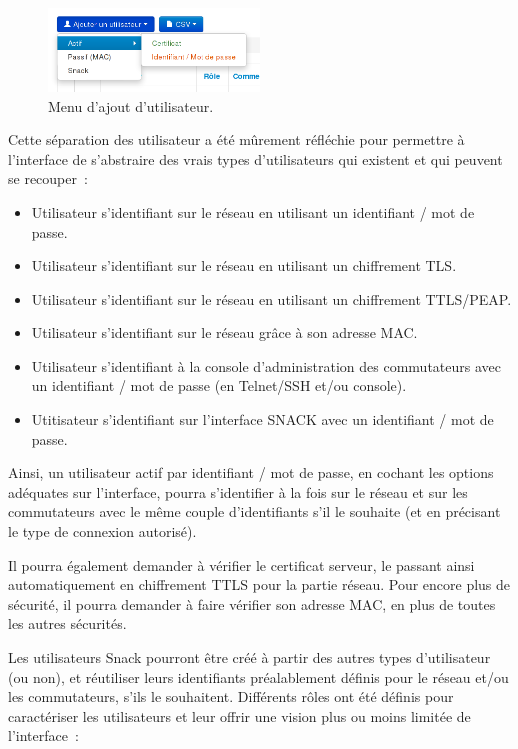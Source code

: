 \begin{figure}[!h]
	\begin{center}
	    \includegraphics[width=0.5\textwidth]{img/menuusers.png}
	\end{center}
	\caption{Menu d'ajout d'utilisateur.}
	\label{menuusers}
\end{figure}

Cette séparation des utilisateur a été mûrement réfléchie pour permettre à l'interface de s'abstraire des vrais types d'utilisateurs qui existent et qui peuvent se recouper~:

\begin{itemize}
\item Utilisateur s'identifiant sur le réseau en utilisant un identifiant / mot de passe.
\item Utilisateur s'identifiant sur le réseau en utilisant un chiffrement TLS.
\item Utilisateur s'identifiant sur le réseau en utilisant un chiffrement TTLS/PEAP.
\item Utilisateur s'identifiant sur le réseau grâce à son adresse MAC.
\item Utilisateur s'identifiant à la console d'administration des commutateurs avec un identifiant / mot de passe (en Telnet/SSH et/ou console).
\item Utitisateur s'identifiant sur l'interface SNACK avec un identifiant / mot de passe.
\end{itemize}

Ainsi, un utilisateur actif par identifiant / mot de passe, en cochant les options adéquates sur l'interface, pourra s'identifier à la fois sur le réseau et sur les commutateurs avec le même couple d'identifiants s'il le souhaite (et en précisant le type de connexion autorisé).

Il pourra également demander à vérifier le certificat serveur, le passant ainsi automatiquement en chiffrement TTLS pour la partie réseau. Pour encore plus de sécurité, il pourra demander à faire vérifier son adresse MAC, en plus de toutes les autres sécurités.

Les utilisateurs Snack pourront être créé à partir des autres types d'utilisateur (ou non), et réutiliser leurs identifiants préalablement définis pour le réseau et/ou les commutateurs, s'ils le souhaitent. Différents rôles ont été définis pour caractériser les utilisateurs et leur offrir une vision plus ou moins limitée de l'interface~:

